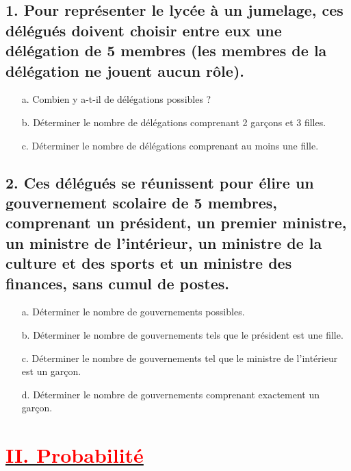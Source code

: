 \documentclass[12pt]{article}
\begin{document}
\subsection*{1. Pour représenter le lycée à un jumelage, ces délégués doivent choisir entre eux une délégation de 5 membres (les membres de la délégation ne jouent aucun rôle).}
\begin{enumerate}
    \item[a.] Combien y a-t-il de délégations possibles ? \\
    
    \item[b.] Déterminer le nombre de délégations comprenant 2 garçons et 3 filles. \\
    
    \item[c.] Déterminer le nombre de délégations comprenant au moins une fille. \\
\end{enumerate}

\subsection*{2. Ces délégués se réunissent pour élire un gouvernement scolaire de 5 membres, comprenant un président, un premier ministre, un ministre de l’intérieur, un ministre de la culture et des sports et un ministre des finances, sans cumul de postes.}
\begin{enumerate}
    \item[a.] Déterminer le nombre de gouvernements possibles. \\
    
    \item[b.] Déterminer le nombre de gouvernements tels que le président est une fille. \\
    
    \item[c.] Déterminer le nombre de gouvernements tel que le ministre de l’intérieur est un garçon. \\
    
    \item[d.] Déterminer le nombre de gouvernements comprenant exactement un garçon. \\
\end{enumerate}
\section*{\underline{\textbf{\textcolor{red}{II. Probabilité}}}}
\end{document}
